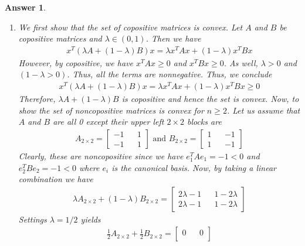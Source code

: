 \documentclass[12pt]{article}
\theoremstyle{colon}
\newtheorem*{answer}{Answer}
\begin{document}
\begin{answer}
  \leavevmode
  \begin{enumerate}[label=\alph*)]
    \item We first show that the set of copositive matrices is convex. Let $A$ and $B$ be copositive matrices and $\lambda \in (0,1)$. Then we have
      \begin{gather*}
        x^T (\lambda A + (1-\lambda)B) x = \lambda x^T A x + (1-\lambda) x^T B x
      \end{gather*}
      However, by copositive, we have $x^T A x \geq 0$ and $x^T B x \geq 0$. As well, $\lambda > 0$ and $(1-\lambda > 0)$. Thus, all the terms are nonnegative. Thus, we conclude
      \begin{gather*}
        x^T (\lambda A + (1-\lambda)B) x = \lambda x^T A x + (1-\lambda) x^T B x \geq 0
      \end{gather*}
      Therefore, $\lambda A + (1-\lambda)B$ is copositive and hence the set is convex. Now, to show the set of noncopositive matrices is convex for $n \geq 2$. Let us assume that $A$ and $B$ are all 0 except their upper left $2 \times 2$ blocks are
      \begin{gather*}
        A_{2 \times 2} = \begin{bmatrix}
          -1 && 1 \\
          -1 && 1
        \end{bmatrix} \text{ and } B_{2 \times 2} = \begin{bmatrix}
          1 && -1 \\
          1 && -1
        \end{bmatrix}
      \end{gather*}
      Clearly, these are noncopositive since we have $e_1^T A e_1 = -1 < 0$ and $e_2^T B e_2 = -1 < 0$ where $e_i$ is the canonical basis. Now, by taking a linear combination we have
      \begin{gather*}
        \lambda A_{2 \times 2} + (1-\lambda) B_{2 \times 2} = \begin{bmatrix}
          2 \lambda - 1 && 1 - 2 \lambda \\
          2 \lambda - 1 && 1 - 2 \lambda
        \end{bmatrix}
      \end{gather*}
      Settings $\lambda = 1/2$ yields
      \begin{gather*}
        \frac{1}{2} A_{2 \times 2} + \frac{1}{2} B_{2 \times 2} = \begin{bmatrix}
          0 && 0 \\

\end{bmatrix}
\end{gather*}
\end{enumerate}
\end{answer}
\end{document}
